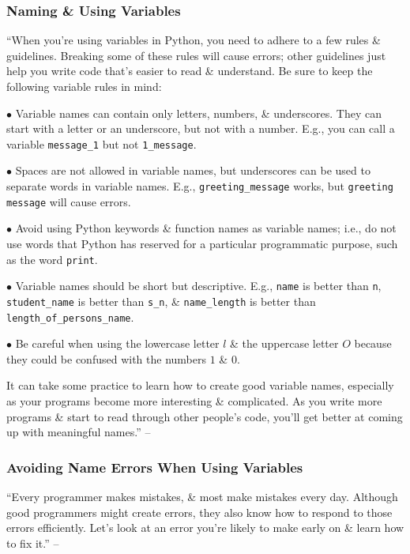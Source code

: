 \documentclass[oneside]{book}
\numberwithin{equation}{section}
\begin{document}
\subsubsection{Naming \& Using Variables}
``When you're using variables in Python, you need to adhere to a few rules \& guidelines. Breaking some of these rules will cause errors; other guidelines just help you write code that's easier to read \& understand. Be sure to keep the following variable rules in mind:
\begin{enumerate*}
	\item[$\bullet$] Variable names can contain only letters, numbers, \& underscores. They can start with a letter or an underscore, but not with a number. E.g., you can call a variable \verb|message_1| but not \verb|1_message|.
	\item[$\bullet$] Spaces are not allowed in variable names, but underscores can be used to separate words in variable names. E.g., \verb|greeting_message| works, but \texttt{greeting message} will cause errors.
	\item[$\bullet$] Avoid using Python keywords \& function names as variable names; i.e., do not use words that Python has reserved for a particular programmatic purpose, such as the word \texttt{print}.
	\item[$\bullet$] Variable names should be short but descriptive. E.g., \texttt{name} is better than \texttt{n}, \verb|student_name| is better than \verb|s_n|, \& \verb|name_length| is better than \verb|length_of_persons_name|.
	\item[$\bullet$] Be careful when using the lowercase letter $l$ \& the uppercase letter $O$ because they could be confused with the numbers $1$ \& $0$.
\end{enumerate*}

It can take some practice to learn how to create good variable names, especially as your programs become more interesting \& complicated. As you write more programs \& start to read through other people's code, you'll get better at coming up with meaningful names.'' -- \cite[p. 17]{Matthes2019}

\subsubsection{Avoiding Name Errors When Using Variables}
``Every programmer makes mistakes, \& most make mistakes every day. Although good programmers might create errors, they also know how to respond to those errors efficiently. Let's look at an error you're likely to make early on \& learn how to fix it.'' -- \cite[p. 17]{Matthes2019}
\end{document}
